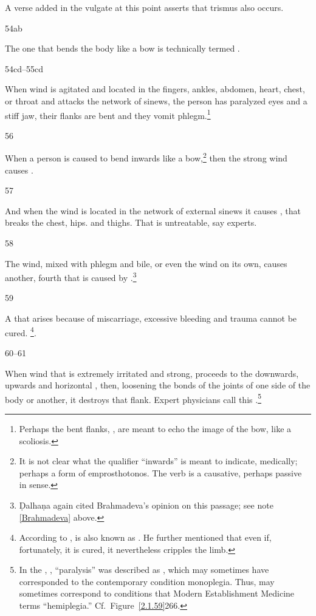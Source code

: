 \begin{translation}
{    A verse added in the vulgate at this point asserts that trismus also occurs.}
    
\item[54ab]

The one that bends the body like a bow is technically termed
. 

\item[54cd--55cd]

When wind is agitated and located in the fingers, ankles, abdomen, heart, chest, 
or throat and attacks the network of sinews, the person has paralyzed eyes and 
a stiff jaw, their flanks are bent and they vomit phlegm.\footnote{Perhaps 
    the bent flanks, , are meant to echo the image of the 
    bow, like a scoliosis.}

\item[56]

When a person is caused to bend inwards like a bow,\footnote{It is not
    clear what the qualifier “inwards” is meant to indicate, medically;
    perhaps a form of emprosthotonos.  The verb  is a
    causative, perhaps passive in sense.} then the strong wind causes
    .

\item[57]

And when the wind is located in the network of external sinews it
causes , that breaks the chest, hips.
and thighs. That is untreatable, say experts.

\item[58]

The wind, mixed with phlegm and bile, or even the wind on its own, causes  
another, fourth  that is caused by 
.\footnote{Ḍalhaṇa again cited Brahmadeva's opinion 
on this passage; see note \ref{Brahmadeva} above.}

\item[59]

A  that arises because of miscarriage,
excessive bleeding and trauma cannot be cured. \footnote{According to
    ,  is also known as
    . He further mentioned that even if, fortunately, it is
    cured, it nevertheless cripples the limb.}.

\item[60--61]

When wind that is extremely irritated and strong, proceeds to the
downwards, upwards and horizontal , then,
loosening the bonds of the joints of one side of the body or another,
it destroys that flank. Expert physicians call this
.\footnote{In the \CS, ,
     “paralysis” was described as , which may sometimes have corresponded to the
    contemporary condition monoplegia. Thus, 
    may sometimes correspond to conditions that Modern Establishment
    Medicine terms “hemiplegia.” Cf.\ Figure~\ref{2.1.59}{266}.}


\end{translation}
